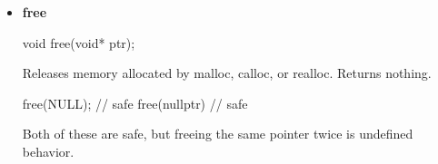 \documentclass{report}
\begin{document}
\begin{itemize}
\begin{cppcode}
                int *tmp = realloc(arr, 10 * sizeof *arr);
                if (!tmp) {
                    free(arr);
                    /* allocation failed */
                } else {
                    arr = tmp;
                }

                free(arr);
            \end{cppcode}
            \bigbreak \noindent 
            If you assign the return value of realloc to the original memory pointer, you loose it if realloc fails and returns NULL.
        \item \textbf{free}
            \bigbreak \noindent 
            \begin{cppcode}
            void free(void* ptr);
            \end{cppcode}
            \bigbreak \noindent 
            Releases memory allocated by malloc, calloc, or realloc.
            \bigbreak \noindent 
            Returns nothing.
            \bigbreak \noindent 
            \begin{cppcode}
            free(NULL); // safe
            free(nullptr) // safe
            \end{cppcode}
            \bigbreak \noindent 
            Both of these are safe, but freeing the same pointer twice is undefined behavior.


    \end{itemize}

    \pagebreak 
\end{document}
